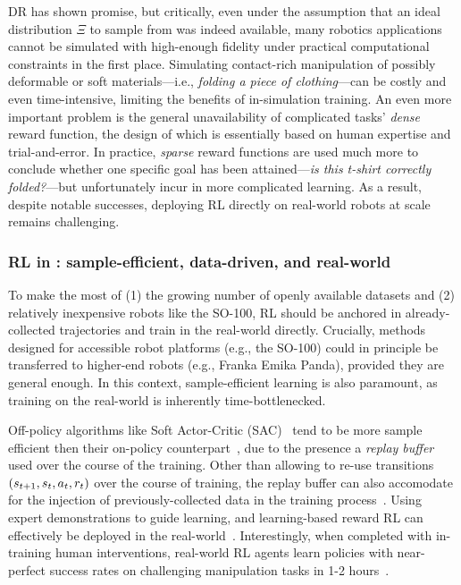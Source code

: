 DR has shown promise, but critically, even under the assumption that an ideal distribution \( \Xi \) to sample from was indeed available, many robotics applications cannot be simulated with high-enough fidelity under practical computational constraints in the first place.
Simulating contact-rich manipulation of possibly deformable or soft materials---i.e., \emph{folding a piece of clothing}---can be costly and even time-intensive, limiting the benefits of in-simulation training.
An even more important problem is the general unavailability of complicated tasks' \emph{dense} reward function, the design of which is essentially based on human expertise and trial-and-error.
In practice, \emph{sparse} reward functions are used much more to conclude whether one specific goal has been attained---\emph{is this t-shirt correctly folded?}---but unfortunately incur in more complicated learning.
As a result, despite notable successes, deploying RL directly on real-world robots at scale remains challenging.

\subsubsection{RL in \lerobot: sample-efficient, data-driven, and real-world}

To make the most of (1) the growing number of openly available datasets and (2) relatively inexpensive robots like the SO-100, RL should be anchored in already-collected trajectories and train in the real-world directly.
Crucially, methods designed for accessible robot platforms (e.g., the SO-100) could in principle be transferred to higher-end robots (e.g., Franka Emika Panda), provided they are general enough.
In this context, sample-efficient learning is also paramount, as training on the real-world is inherently time-bottlenecked.

Off-policy algorithms like Soft Actor-Critic (SAC)~\citep{haarnojaSoftActorCriticOffPolicy2018} tend to be more sample efficient then their on-policy counterpart~\citep{schulmanProximalPolicyOptimization2017}, due to the presence a \emph{replay buffer} used over the course of the training.
Other than allowing to re-use transitions \( (s_{t+1}, s_t, a_t, r_t) \) over the course of training, the replay buffer can also accomodate for the injection of previously-collected data in the training process~\citep{ballEfficientOnlineReinforcement2023}.
Using expert demonstrations to guide learning, and learning-based reward RL can effectively be deployed in the real-world~\citep{luoSERLSoftwareSuite2025}.
Interestingly, when completed with in-training human interventions, real-world RL agents learn policies with near-perfect success rates on challenging manipulation tasks in 1-2 hours~\citep{luoPreciseDexterousRobotic2024}.


